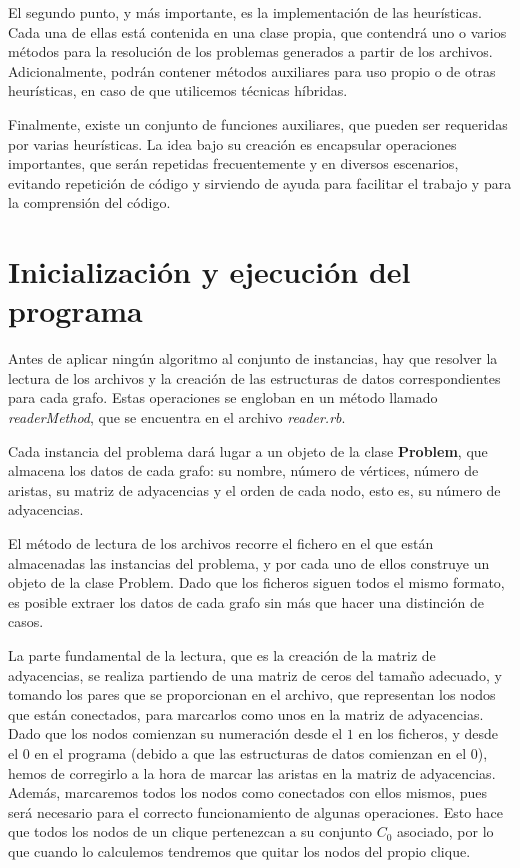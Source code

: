 El segundo punto, y más importante, es la implementación de las heurísticas.
Cada una de ellas está contenida en una clase propia, que contendrá uno o varios
métodos para la resolución de los problemas generados a partir de los archivos.
Adicionalmente, podrán contener métodos auxiliares para uso propio o de otras
heurísticas, en caso de que utilicemos técnicas híbridas.

Finalmente, existe un conjunto de funciones auxiliares, que pueden ser
requeridas por varias heurísticas. La idea bajo su creación es encapsular
operaciones importantes, que serán repetidas frecuentemente y en diversos
escenarios, evitando repetición de código y sirviendo de ayuda para facilitar
el trabajo y para la comprensión del código.


\section{Inicialización y ejecución del programa}

Antes de aplicar ningún algoritmo al conjunto de instancias, hay que resolver la
lectura de los archivos y la creación de las estructuras de datos correspondientes
para cada grafo. Estas operaciones se engloban en un método llamado \textit{readerMethod},
que se encuentra en el archivo \textit{reader.rb}.

Cada instancia del problema dará lugar a un objeto de la clase \textbf{Problem}, que
almacena los datos de cada grafo: su nombre, número de vértices, número de aristas,
su matriz de adyacencias y el orden de cada nodo, esto es, su número de adyacencias.

El método de lectura de los archivos recorre el fichero en el que están almacenadas
las instancias del problema, y por cada uno de ellos construye un objeto de la clase
Problem. Dado que los ficheros siguen todos el mismo formato, es posible extraer
los datos de cada grafo sin más que hacer una distinción de casos.

La parte fundamental de la lectura, que es la creación de la matriz de adyacencias,
se realiza partiendo de una matriz de ceros del tamaño adecuado, y tomando
los pares que se proporcionan en el archivo, que representan los nodos que están
conectados, para marcarlos como unos en la matriz de adyacencias. Dado que los
nodos comienzan su numeración desde el $1$ en los ficheros, y desde el $0$ en el
programa (debido a que las estructuras de datos comienzan en el $0$), hemos de
corregirlo a la hora de marcar las aristas en la matriz de adyacencias. Además,
marcaremos todos los nodos como conectados con ellos mismos, pues será necesario
para el correcto funcionamiento de algunas operaciones. Esto hace que todos los
nodos de un clique pertenezcan a su conjunto $C_0$ asociado, por lo que cuando lo
calculemos tendremos que quitar los nodos del propio clique.

